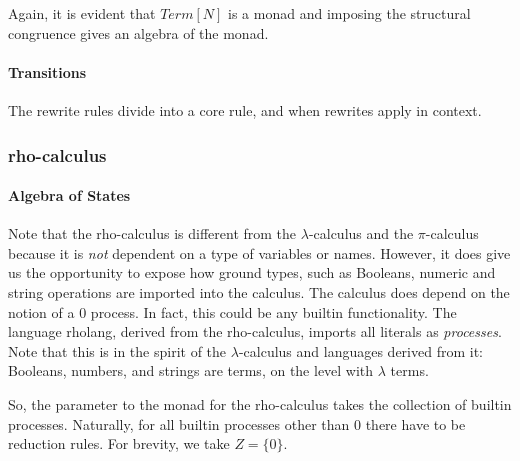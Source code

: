 Again, it is evident that $Term[N]$ is a monad and imposing the structural congruence gives an algebra of the monad.

\paragraph{Transitions}
The rewrite rules divide into a core rule, and when rewrites apply in
context.

\subsubsection{rho-calculus}

\paragraph{Algebra of States}
Note that the rho-calculus is different from the $\lambda$-calculus and the $\pi$-calculus because it is \emph{not} dependent on a type of variables or names. However, it does give us the opportunity to expose how ground types, such as Booleans, numeric and string operations are imported into the calculus. The calculus does depend on the notion of a $0$ process. In fact, this could be any builtin functionality. The language rholang, derived from the rho-calculus, imports all literals as \emph{processes}. Note that this is in the spirit of the $\lambda$-calculus and languages derived from it: Booleans, numbers, and strings are terms, on the level with $\lambda$ terms.

So, the parameter to the monad for the rho-calculus takes the collection of builtin processes. Naturally, for all builtin processes other than $0$ there have to be reduction rules. For brevity, we take $Z = \{0\}$.

